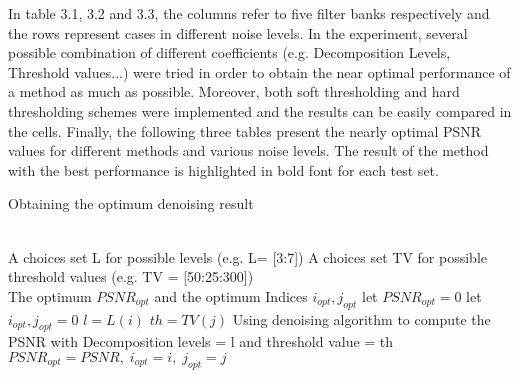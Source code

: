In table 3.1, 3.2 and 3.3, the columns refer to five filter banks respectively and the rows represent cases in different noise levels. In the experiment, several possible combination of different coefficients (e.g. Decomposition Levels, Threshold values...) were tried in order to obtain the near optimal performance of a method as much as possible. Moreover, both soft thresholding and hard thresholding schemes were implemented and the results can be easily compared in the cells. Finally, the following three tables present the nearly optimal PSNR values for different methods and various noise levels. The result of the method with the best performance is highlighted in bold font for each test set.\\

\begin{algorithm} 
\caption{Obtaining the optimum denoising result}  
\label{alg:4}  
\begin{algorithmic}
\REQUIRE ~~\\ %
A choices set L for possible levels (e.g. L= [3:7])
A choices set TV for possible threshold values (e.g. TV = [50:25:300])
\ENSURE ~~\\ %
The optimum $PSNR_{opt}$ and the optimum Indices $i_{opt},j_{opt}$
\STATE let $PSNR_{opt} = 0$
\STATE let $i_{opt} , j_{opt} =0$
\STATE $l = L(i)$
\STATE $th = TV(j)$
\STATE Using denoising algorithm to compute the PSNR with Decomposition levels = l and threshold value = th
\STATE $PSNR_{opt} = PSNR, \; i_{opt} = i,\; j_{opt} = j$ 
\ENDIF
\ENDFOR
\ENDFOR

\end{algorithmic}  
\end{algorithm}  
\vfill
